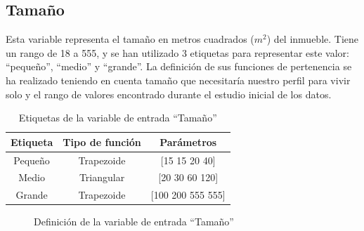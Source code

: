\documentclass[12pt]{report} %
\begin{document}
        \subsection{Tamaño}
        Esta variable representa el tamaño en metros cuadrados ($m^2$) del inmueble.
        Tiene un rango de 18 a 555, y se han utilizado 3 etiquetas para representar este valor: ``pequeño'', ``medio'' y ``grande''.
        La definición de sus funciones de pertenencia se ha realizado teniendo en cuenta tamaño que necesitaría nuestro perfil para vivir solo y el rango de valores encontrado durante el estudio inicial de los datos.

        \begin{table}[h]
            \center
            \begin{tabular}{@{}ccc@{}}
                \toprule
                \textbf{Etiqueta} & \textbf{Tipo de función} & \textbf{Parámetros} \\
                \midrule
                Pequeño & Trapezoide & [15 15 20 40]     \\
                Medio   & Triangular & [20 30 60 120]    \\
                Grande  & Trapezoide & [100 200 555 555] \\
                \bottomrule
            \end{tabular}
            \caption{Etiquetas de la variable de entrada ``Tamaño''}
        \end{table}

        \begin{figure}[H]
            \centering
            \caption{Definición de la variable de entrada ``Tamaño''}
        \end{figure}
\end{document}
